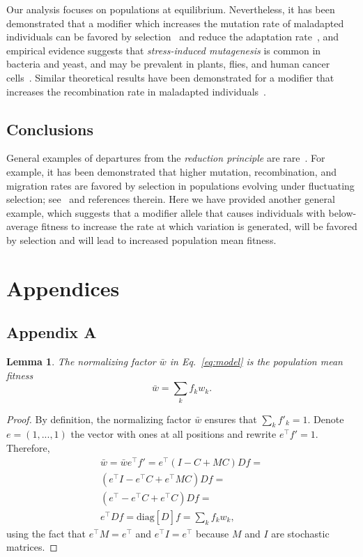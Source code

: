 \documentclass[9pt, a4paper, twocolumn]{extarticle}
\newcommand*{\tr}{^\intercal}
\newcommand{\matrx}[1]{{\left[ \stackrel{}{#1}\right]}}
\newcommand{\diag}[1]{\mbox{diag}\matrx{#1}}
\newtheorem{lemma}{Lemma}
\begin{document}
Our analysis focuses on populations at equilibrium.
Nevertheless, it has been demonstrated that a modifier which increases the mutation rate of maladapted individuals can be favored by selection~\citep{Ram2012} and reduce the adaptation rate~\citep{Ram2014},
and empirical evidence suggests that \emph{stress-induced mutagenesis} is common in bacteria and yeast, and may be prevalent in plants, flies, and human cancer cells~\citep{Rosenberg2012,Fitzgerald2017b}.
Similar theoretical results have been demonstrated for a modifier that increases the recombination rate in maladapted individuals~\citep{Hadany2003b,Hadany2003a}.

\subsection*{Conclusions}

General examples of departures from the \emph{reduction principle} are rare~\citep{Altenberg2017}.
For example, it has been demonstrated that higher mutation, recombination, and migration rates are favored by selection in populations evolving under fluctuating selection; see~\citet{Carja2014} and references therein.
Here we have provided another general example, which suggests that a modifier allele that causes individuals with below-average fitness to increase the rate at which variation is generated, will be favored by selection and will lead to increased population mean fitness.

\section*{Appendices}
\subsection*{Appendix A}\label{sec:AppA}

\begin{lemma}
The normalizing factor $\bar{w}$ in Eq.~\ref{eq:model} is the population mean fitness
\begin{equation}
\bar{w} = \sum_k{f_k w_k}.
\end{equation}
\end{lemma}

\begin{proof}
By definition, the normalizing factor $\bar{w}$ ensures that $\sum_k{f'_k}=1$.
Denote $e = (1, ..., 1)$ the vector with ones at all positions and rewrite $e\tr f' = 1$.
Therefore, 
\begin{multline}\label{eq:mean_fitness}
\bar{w} = 
\bar{w} e\tr f' = 
e\tr (I - C + M C) D f = \\
(e\tr I - e\tr C + e\tr M C) D f = \\
(e\tr - e\tr C + e\tr C) D f = \\
e\tr D f = 
\diag{D} f = 
\sum_k{f_k w_k},
\end{multline}
using the fact that $e\tr M = e\tr$ and $e\tr I = e\tr$ because $M$ and $I$ are stochastic matrices.
\end{proof}
\end{document}
